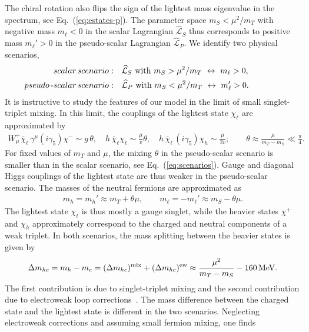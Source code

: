 \documentclass[nofootinbib,prd,aps,superscriptaddress,preprintnumbers]{revtex4}
\begin{document}
The chiral rotation also flips the sign of the lightest mass eigenvalue in the spectrum, see Eq.~(\ref{eq:estates-p}). The parameter space $m_S < \mu^2/m_T$ with negative mass $m_\ell < 0$ in the scalar Lagrangian $\widehat{\mathcal{L}}_S$ thus corresponds to positive mass $m_{\ell}' > 0$ in the pseudo-scalar Lagrangian $\widehat{\mathcal{L}}_P$. We identify two physical scenarios,
\begin{align}\label{eq:scenarios}
scalar\,scenario: & \quad \widehat{\mathcal{L}}_S \text{ with } m_S > \mu^2/m_T\ \leftrightarrow\ m_{\ell} > 0,\qquad \qquad \\\nonumber
pseudo\text{\,-}scalar\,scenario: & \quad \widehat{\mathcal{L}}_P \text{ with } m_S < \mu^2/m_T\ \leftrightarrow\ m_{\ell}' > 0.
\end{align}
It is instructive to study the features of our model in the limit of small singlet-triplet mixing. In this limit, the couplings of the lightest state $\chi_\ell$ are approximated by
\begin{align}\label{eq:couplings-small}
W^+_\mu \overline{\chi}_\ell\,\gamma^\mu(i\gamma_5) \chi^- \sim g\,\theta,\quad h\,\overline{\chi}_\ell \chi_\ell \sim \frac{\mu}{v}\theta,\quad h\,\overline{\chi}_\ell\, (i\gamma_5) \chi_h \sim \frac{\mu}{2v};\qquad \theta \approx \frac{\mu}{m_T - m_S} \ll \frac{\pi}{4}.
\end{align}
For fixed values of $m_T$ and $\mu$, the mixing $\theta$ in the pseudo-scalar scenario is smaller than in the scalar scenario, see Eq.~(\ref{eq:scenarios}). Gauge and diagonal Higgs couplings of the lightest state are thus weaker in the pseudo-scalar scenario. The masses of the neutral fermions are approximated as
\begin{align}\label{eq:spectrum-small}
m_h = m_h' \approx m_T + \theta \mu,\qquad m_\ell = -m_\ell' \approx m_S - \theta \mu.
\end{align}
The lightest state $\chi_\ell$ is thus mostly a gauge singlet, while the heavier states $\chi^+$ and $\chi_h$ approximately correspond to the charged and neutral components of a weak triplet. In both scenarios, the mass splitting between the heavier states is given by
\begin{align}\label{eq:deltahc}
\Delta m_{hc} = m_h - m_c = (\Delta m_{hc})^{\rm mix} + (\Delta m_{hc})^{\rm ew} \approx \frac{\mu^2}{m_T - m_S} - 160\,\text{MeV}.
\end{align}
The first contribution is due to singlet-triplet mixing and the second contribution due to electroweak loop corrections~\cite{Ibe:2012sx}. The mass difference between the charged state and the lightest state is different in the two scenarios. Neglecting electroweak corrections and assuming small fermion mixing, one finds
\end{document}
